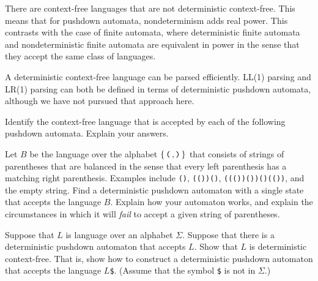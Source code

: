 There are context-free languages that are not deterministic context-free.
This means that for pushdown automata, nondeterminism adds real power.
This contrasts with the case of finite automata, where deterministic
finite automata and nondeterministic finite automata are equivalent in
power in the sense that they accept the same class of languages.

A deterministic context-free language can be parsed efficiently.
LL(1) parsing and LR(1) parsing can both be defined in terms of deterministic
pushdown automata, although we have not pursued that approach here.







\begin{exercises}

\problem Identify the context-free language that is accepted by each of the following
pushdown automata.  Explain your answers.

\medskip

\ppart {}

\medskip

\ppart {}

\medskip

\ppart {}

\medskip

\ppart {}


\problem Let $B$ be the language over the alphabet $\{\,\hbox{\tt(}\,,\hbox{\tt)}\,\}$ that consists of 
strings of parentheses that are balanced in the sense that every left parenthesis has
a matching right parenthesis.  Examples include {\tt ()}, {\tt (())()}, {\tt((())())()(())},
and the empty string.  Find a deterministic pushdown automaton with a single state that
accepts the language $B$.  Explain how your automaton works, and explain the circumstances
in which it will \emph{fail} to accept a given string of parentheses.

\problem Suppose that $L$ is language over an alphabet $\Sigma$.
Suppose that there is a deterministic pushdown automaton that accepts $L$.
Show that $L$ is deterministic context-free.  That is, show how to construct
a deterministic pushdown automaton that accepts the language $L${\tt\$}.
(Assume that the symbol {\tt\$} is not in $\Sigma$.)


\end{exercises}
